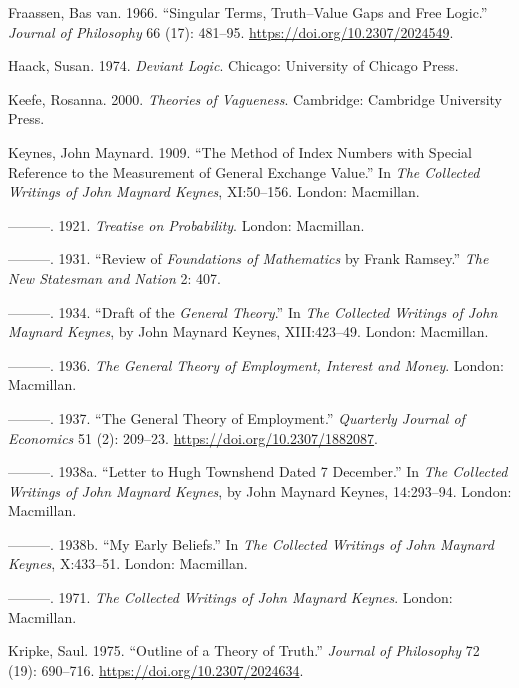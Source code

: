 \documentclass[noflushend]{philosophersimprint}
\begin{document}
\begin{CSLReferences}{1}{0}
\leavevmode\hypertarget{ref-vanFraassen1966}{}%
Fraassen, Bas van. 1966. {``Singular Terms, Truth--Value Gaps and Free
Logic.''} \emph{Journal of Philosophy} 66 (17): 481--95.
\url{https://doi.org/10.2307/2024549}.

\leavevmode\hypertarget{ref-Haack1974}{}%
Haack, Susan. 1974. \emph{Deviant Logic}. Chicago: University of Chicago
Press.

\leavevmode\hypertarget{ref-Keefe2000}{}%
Keefe, Rosanna. 2000. \emph{Theories of Vagueness}. Cambridge: Cambridge
University Press.

\leavevmode\hypertarget{ref-Keynes1909}{}%
Keynes, John Maynard. 1909. {``The Method of Index Numbers with Special
Reference to the Measurement of General Exchange Value.''} In \emph{The
Collected Writings of John Maynard Keynes}, XI:50--156. London:
Macmillan.

\leavevmode\hypertarget{ref-Keynes1921}{}%
---------. 1921. \emph{Treatise on Probability}. London: Macmillan.

\leavevmode\hypertarget{ref-Keynes1931}{}%
---------. 1931. {``Review of \emph{Foundations of Mathematics} by Frank
Ramsey.''} \emph{The New Statesman and Nation} 2: 407.

\leavevmode\hypertarget{ref-Keynes1934}{}%
---------. 1934. {``Draft of the \emph{General Theory}.''} In \emph{The
Collected Writings of John Maynard Keynes}, by John Maynard Keynes,
XIII:423--49. London: Macmillan.

\leavevmode\hypertarget{ref-Keynes1936}{}%
---------. 1936. \emph{The General Theory of Employment, Interest and
Money}. London: Macmillan.

\leavevmode\hypertarget{ref-Keynes1937}{}%
---------. 1937. {``The General Theory of Employment.''} \emph{Quarterly
Journal of Economics} 51 (2): 209--23.
\url{https://doi.org/10.2307/1882087}.

\leavevmode\hypertarget{ref-Keynes1938}{}%
---------. 1938a. {``Letter to Hugh Townshend Dated 7 December.''} In
\emph{The Collected Writings of John Maynard Keynes}, by John Maynard
Keynes, 14:293--94. London: Macmillan.

\leavevmode\hypertarget{ref-KeynesMEB}{}%
---------. 1938b. {``My Early Beliefs.''} In \emph{The Collected
Writings of John Maynard Keynes}, X:433--51. London: Macmillan.

\leavevmode\hypertarget{ref-KeynesCW}{}%
---------. 1971. \emph{The Collected Writings of John Maynard Keynes}.
London: Macmillan.

\leavevmode\hypertarget{ref-Kripke1975}{}%
Kripke, Saul. 1975. {``Outline of a Theory of Truth.''} \emph{Journal of
Philosophy} 72 (19): 690--716. \url{https://doi.org/10.2307/2024634}.


\end{CSLReferences}
\end{document}
